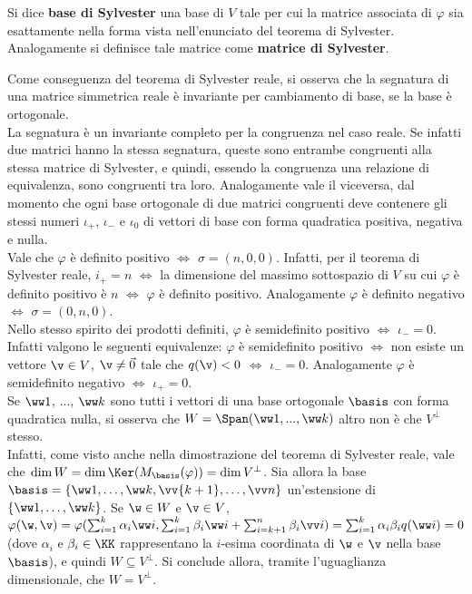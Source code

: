 \begin{definition}
	Si dice \textbf{base di Sylvester} una base di $V$ tale per cui la
	matrice associata di $\varphi$ sia esattamente nella forma
	vista nell'enunciato del teorema di Sylvester. Analogamente
	si definisce tale matrice come \textbf{matrice di Sylvester}.
\end{definition}

\begin{remark} \nl
	\li Come conseguenza del teorema di Sylvester reale, si osserva che la segnatura di una matrice simmetrica reale
	è invariante per cambiamento di base, se la base è ortogonale. \\
	
	\li La segnatura è un invariante completo per la congruenza nel caso reale. Se infatti due matrici hanno la stessa segnatura, queste sono
	entrambe congruenti alla stessa matrice di Sylvester, e quindi, essendo
	la congruenza una relazione di equivalenza, sono congruenti
	tra loro. Analogamente vale il viceversa, dal momento che ogni
	base ortogonale di due matrici congruenti deve contenere gli
	stessi numeri $\iota_+$, $\iota_-$ e $\iota_0$ di vettori
	di base con forma quadratica positiva, negativa e nulla. \\
	
	\li Vale che $\varphi$ è definito positivo $\iff$ $\sigma = (n, 0, 0)$. Infatti, per il teorema
	di Sylvester reale, $i_+ = n$ $\iff$ la dimensione del massimo sottospazio di $V$ su cui $\varphi$
	è definito positivo è $n$ $\iff$ $\varphi$ è definito positivo. Analogamente $\varphi$ è definito
	negativo $\iff$ $\sigma = (0, n, 0)$. \\
	
	\li Nello stesso spirito dei prodotti definiti, $\varphi$ è semidefinito positivo $\iff$ $\iota_- = 0$.
	Infatti valgono le seguenti equivalenze: $\varphi$ è semidefinito positivo $\iff$ non esiste un vettore
	$\v \in V$, $\v \neq \vec 0$ tale che $q(\v) < 0$ $\iff$ $\iota_- = 0$. Analogamente $\varphi$ è semidefinito
	negativo $\iff$ $\iota_+ = 0$. \\
	
	\li Se $\ww 1$, ..., $\ww k$ sono tutti i vettori di una base
	ortogonale $\basis$ con forma quadratica nulla, si osserva che $W = \Span(\ww 1, ..., \ww k)$ altro non è che $V^\perp$ stesso. \\
	
	Infatti, come
	visto anche nella dimostrazione del teorema di Sylvester reale, vale
	che	$\dim W = \dim \Ker (M_\basis(\varphi)) = \dim V^\perp$.
	Sia allora la base $\basis = \{\ww 1, \ldots, \ww k, \vv{k+1}, \ldots, \vv n\}$ un'estensione di $\{\ww 1, \ldots, \ww k\}$. Se $\w \in W$ e $\v \in V$, $\varphi(\w, \v) = \varphi(\sum_{i=1}^k
	\alpha_i \ww i, \sum_{i=1}^k \beta_i \ww i + \sum_{i=k+1}^n \beta_i \vv i)
	= \sum_{i=1}^k \alpha_i \beta_i q(\ww i) = 0$ (dove $\alpha_i$ e $\beta_i \in \KK$ rappresentano la $i$-esima coordinata di $\w$ e $\v$ nella base $\basis$), e quindi
	$W \subseteq V^\perp$. Si conclude allora, tramite l'uguaglianza
	dimensionale, che $W = V^\perp$. \\
	

\end{remark}
